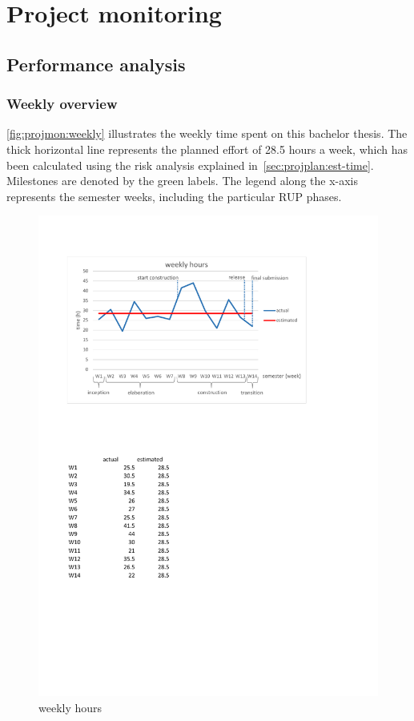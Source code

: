 \chapter{Project monitoring}
\section{Performance analysis}
\subsection{Weekly overview}

\autoref{fig:projmon:weekly} illustrates the weekly time spent on this bachelor
thesis. The thick horizontal line represents the planned effort of 28.5 hours a
week, which has been calculated using the risk analysis explained
in~\autoref{sec:projplan:est-time}.  Milestones are denoted by the green
labels. The legend along the x-axis represents the semester weeks, including
the particular RUP phases.


\begin{figure}[]
	\includegraphics[trim=4cm 2cm 3.5cm 2.8cm, clip=true, width=\textwidth]{img/project_monitoring_weekly_diagram.pdf}
	\caption{weekly hours}
	\label{fig:weekly:hours}
\end{figure}

